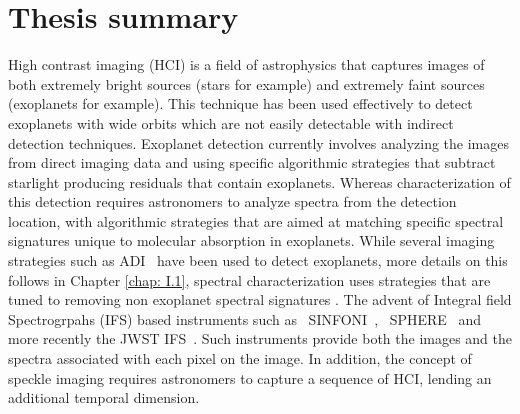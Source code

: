 \chapter*{Thesis summary}
High contrast imaging (HCI) is a field of astrophysics that captures images of both extremely bright sources (stars for example) and extremely faint sources (exoplanets for example).
This technique has been used effectively to detect exoplanets with wide orbits which are not easily detectable with indirect detection techniques.
Exoplanet detection currently involves analyzing the images from direct imaging data and using specific algorithmic strategies that subtract starlight producing residuals that contain exoplanets.
Whereas characterization of this detection requires astronomers to analyze spectra from the detection location, with algorithmic strategies that are aimed at matching specific spectral signatures unique to molecular absorption in exoplanets.
While several imaging strategies such as ADI~\citep[][]{2006MaroisADI} have been used to detect exoplanets, more details on this follows in 
Chapter \ref{chap: I.1}, spectral characterization uses strategies that are tuned to removing non exoplanet spectral signatures \citep[e.g][]{2002SparksSDI}.
The advent of Integral field Spectrogrpahs (IFS) based instruments such as ~SINFONI~\citep[][]{2004SINFONI}, ~SPHERE~\citep[][]{2008Boccaletti} and more recently the JWST IFS~\citep[][]{2022BokerJWST}.
Such instruments provide both the images and the spectra associated with each pixel on the  image.
In addition, the concept of speckle imaging requires astronomers to capture a sequence of HCI, lending an additional temporal dimension.


